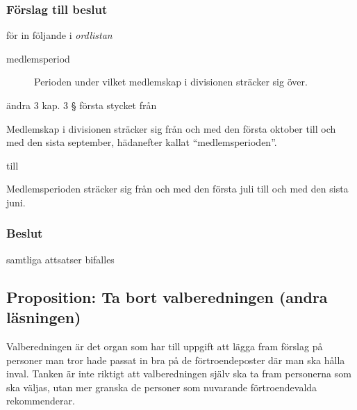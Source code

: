 \documentclass[protokoll]{dvd}
\begin{document}
\subsubsection*{Förslag till beslut}

\begin{attsatser}
	\item för in följande i \emph{ordlistan}

	\begin{displayquote}
		\begin{description}
			\item[medlemsperiod] Perioden under vilket medlemskap i divisionen sträcker sig över.
		\end{description}
	\end{displayquote}

	\item ändra 3 kap. 3 § första stycket från

	\begin{displayquote}
		Medlemskap i divisionen sträcker sig från och med den första oktober till och med den sista september, hädanefter kallat ``medlemsperioden''.
	\end{displayquote}

	till

	\begin{displayquote}
		Medlemsperioden sträcker sig från och med den första juli till och med den sista juni.
	\end{displayquote}
\end{attsatser}

\subsubsection*{Beslut}
    \begin{attsatser}
        \item samtliga attsatser bifalles
    \end{attsatser}

\newpage
\subsection{Proposition: Ta bort valberedningen (andra läsningen)}

Valberedningen är det organ som har till uppgift att lägga fram förslag på personer man tror hade passat in bra på de förtroendeposter där man ska hålla inval.
Tanken är inte riktigt att valberedningen själv ska ta fram personerna som ska väljas, utan mer granska de personer som nuvarande förtroendevalda rekommenderar.
\end{document}
